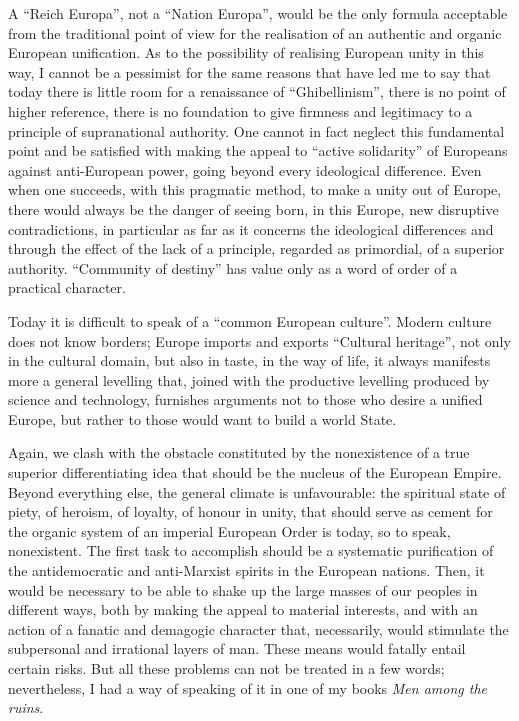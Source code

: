 A ``Reich Europa'', not a ``Nation Europa'', would be the only formula acceptable from the traditional point of view for the realisation of an authentic and organic European unification. As to the possibility of realising European unity in this way, I cannot be a pessimist for the same reasons that have led me to say that today there is little room for a renaissance of ``Ghibellinism'', there is no point of higher reference, there is no foundation to give firmness and legitimacy to a principle of supranational authority. One cannot in fact neglect this fundamental point and be satisfied with making the appeal to ``active solidarity'' of Europeans against anti-European power, going beyond every ideological difference. Even when one succeeds, with this pragmatic method, to make a unity out of Europe, there would always be the danger of seeing born, in this Europe, new disruptive contradictions, in particular as far as it concerns the ideological differences and through the effect of the lack of a principle, regarded as primordial, of a superior authority. ``Community of destiny'' has value only as a word of order of a practical character.

Today it is difficult to speak of a ``common European culture''. Modern culture does not know borders; Europe imports and exports ``Cultural heritage'', not only in the cultural domain, but also in taste, in the way of life, it always manifests more a general levelling that, joined with the productive levelling produced by science and technology, furnishes arguments not to those who desire a unified Europe, but rather to those would want to build a world State.

Again, we clash with the obstacle constituted by the nonexistence of a true superior differentiating idea that should be the nucleus of the European Empire. Beyond everything else, the general climate is unfavourable: the spiritual state of piety, of heroism, of loyalty, of honour in unity, that should serve as cement for the organic system of an imperial European Order is today, so to speak, nonexistent. The first task to accomplish should be a systematic purification of the antidemocratic and anti-Marxist spirits in the European nations. Then, it would be necessary to be able to shake up the large masses of our peoples in different ways, both by making the appeal to material interests, and with an action of a fanatic and demagogic character that, necessarily, would stimulate the subpersonal and irrational layers of man. These means would fatally entail certain risks. But all these problems can not be treated in a few words; nevertheless, I had a way of speaking of it in one of my books \emph{Men among the ruins}.



